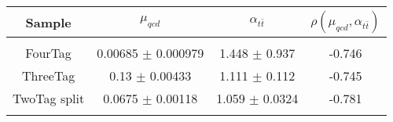 \begin{footnotesize} 
\begin{tabular}{c|c|c|c} 
Sample & $\mu_{qcd}$ & $\alpha_{t\bar{t}}$ & $\rho(\mu_{qcd}, \alpha_{t\bar{t}})$ \\ 
\hline\hline 
& & & \\ 
FourTag & 0.00685 $\pm$ 0.000979 & 1.448 $\pm$ 0.937 & -0.746\\ 
ThreeTag & 0.13 $\pm$ 0.00433 & 1.111 $\pm$ 0.112 & -0.745\\ 
TwoTag split & 0.0675 $\pm$ 0.00118 & 1.059 $\pm$ 0.0324 & -0.781\\ 
& & & \\ 
\hline\hline 
\end{tabular} 
\end{footnotesize} 
\newline 
